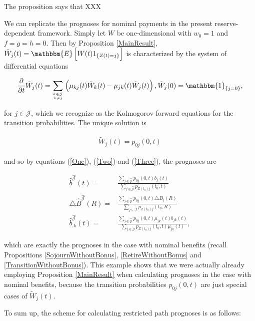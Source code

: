 \documentclass{article}
\newcommand{\1}[1]{\mathbbm{1}_{\left\lbrace #1 \right\rbrace}}
\newcommand{\expec}[1][def]{\mathbbm{E} \left[ #1 \right]}
\theoremstyle{break}
\theoremstyle{remark}
\newenvironment{remark}
  {\pushQED{\qed}\renewcommand{\qedsymbol}{\scalebox{1.4}{$\circ$}}\remarkx}
  {\popQED\endremarkx}
\numberwithin{equation}{section}
\begin{document}
The proposition says that XXX

\begin{remark} \label{WithoutBonusAsSpecialCase}
	We can replicate the prognoses for nominal payments in the present reserve-dependent framework. Simply let $W$ be one-dimensional with $w_0=1$ and $f=g=h=0$. Then by Proposition \ref{MainResult}, $\tilde{W}_j(t)=\expec[W(t) 1_{\{Z(t)=j\}}]$ is characterized by the system of differential equations
	
	\begin{align*}
		\frac{\partial}{\partial t} \tilde{W}_j(t) = \sum_{k \in \mathcal{J} \atop k \neq j} \left( \mu_{kj}(t) \tilde{W}_k(t) - \mu_{jk}(t) \tilde{W}_j(t) \right), \tilde{W}_j(0) = \1{j=0},
	\end{align*}
	
	for $j \in \mathcal{J}$, which we recognize as the Kolmogorov forward equations for the transition probabilities. The unique solution is
	
	\begin{align*}
		\tilde{W}_j(t) = p_{0j}(0,t)
	\end{align*}
	
	and so by equations (\ref{One}), (\ref{Two}) and (\ref{Three}), the prognoses are
	
\begin{align*}
	\hat{b}^{\hat{\mathcal{J}}}(t) =& \frac{\sum_{j \in \hat{\mathcal{J}}} p_{0j}(0,t) b_j(t)}{\sum_{j \in \hat{\mathcal{J}}} p_{Z(t_0)j}(t_0,t)} \\
	\triangle \hat{B}^{\hat{\mathcal{J}}}(R) =& \frac{\sum_{j \in \hat{\mathcal{J}}} p_{0j}(0,t) \triangle B_j(R)}{\sum_{j \in \hat{\mathcal{J}}} p_{Z(t_0)j}(t_0,R)} \\
	\hat{b}_{\cdot k}^{\hat{\mathcal{J}}}(t) =& \frac{\sum_{j \in \hat{\mathcal{J}}} p_{0j}(0,t) \mu_{jk}(t) b_{jk}(t)}{\sum_{j \in \hat{\mathcal{J}}} p_{Z(t_0)j}(t_0,t) \mu_{jk}(t)},
\end{align*}
	
	which are exactly the prognoses in the case with nominal benefits (recall Propositions \ref{SojournWithoutBonus}, \ref{RetireWithoutBonus} and \ref{TransitionWithoutBonus}). This example shows that we were actually already employing Proposition \ref{MainResult} when calculating prognoses in the case with nominal benefits, because the transition probabilities $p_{0j}(0,t)$ are just special cases of $\tilde{W}_j(t)$.
\end{remark}

To sum up, the scheme for calculating restricted path prognoses is as follows:
\end{document}
